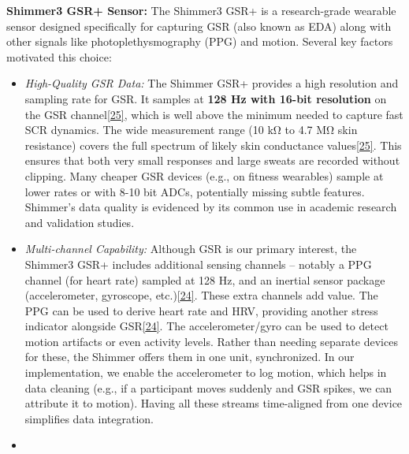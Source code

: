 \documentclass[12pt,a4paper]{article}
\begin{document}
\textbf{Shimmer3 GSR+ Sensor:} The Shimmer3 GSR+ is a research-grade wearable sensor designed specifically for capturing GSR (also known as EDA) along with other signals like photoplethysmography (PPG) and motion. Several key factors motivated this choice:

\begin{itemize}
\item
  \emph{High-Quality GSR Data:} The Shimmer GSR+ provides a high resolution and sampling rate for GSR. It samples at \textbf{128 Hz with 16-bit resolution} on the GSR channel\href{https://github.com/buccancs/gsr_rgbt_project/blob/ea44d0298e0379541f112f76eb809976f3771fa3/docs/hardware.md\#L118-L126}{{[}25{]}}, which is well above the minimum needed to capture fast SCR dynamics. The wide measurement range (10 kΩ to 4.7 MΩ skin resistance) covers the full spectrum of likely skin conductance values\href{https://github.com/buccancs/gsr_rgbt_project/blob/ea44d0298e0379541f112f76eb809976f3771fa3/docs/hardware.md\#L118-L126}{{[}25{]}}. This ensures that both very small responses and large sweats are recorded without clipping. Many cheaper GSR devices (e.g., on fitness wearables) sample at lower rates or with 8-10 bit ADCs, potentially missing subtle features. Shimmer's data quality is evidenced by its common use in academic research and validation studies.
\item
  \emph{Multi-channel Capability:} Although GSR is our primary interest, the Shimmer3 GSR+ includes additional sensing channels -- notably a PPG channel (for heart rate) sampled at 128 Hz, and an inertial sensor package (accelerometer, gyroscope, etc.)\href{https://github.com/buccancs/bucika_gsr/blob/7048f7f6a7536f5cd577ed2184800d3dad97fd08/docs/architecture.md\#L201-L205}{{[}24{]}}. These extra channels add value. The PPG can be used to derive heart rate and HRV, providing another stress indicator alongside GSR\href{https://github.com/buccancs/bucika_gsr/blob/7048f7f6a7536f5cd577ed2184800d3dad97fd08/docs/architecture.md\#L201-L205}{{[}24{]}}. The accelerometer/gyro can be used to detect motion artifacts or even activity levels. Rather than needing separate devices for these, the Shimmer offers them in one unit, synchronized. In our implementation, we enable the accelerometer to log motion, which helps in data cleaning (e.g., if a participant moves suddenly and GSR spikes, we can attribute it to motion). Having all these streams time-aligned from one device simplifies data integration.
\item

\end{itemize}
\end{document}
